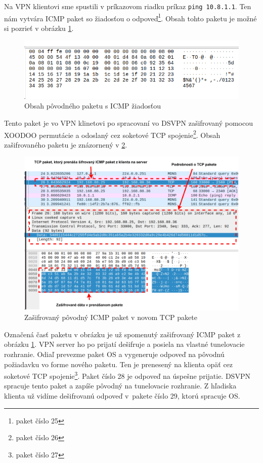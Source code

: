 Na VPN klientovi sme spustili v príkazovom riadku príkaz \lstinline|ping 10.8.1.1|. Ten nám vytvára ICMP paket so žiadosťou o odpoveď\footnote{paket číslo 25}. Obsah tohto paketu je možné si pozrieť v obrázku \ref{req}. %
\begin{figure}[h!]
	\centering
	\includegraphics[width=1\textwidth]{figures/req}
	\caption{Obsah pôvodného paketu s ICMP žiadosťou}
	\label{req}
\end{figure}
Tento paket je vo VPN klinetovi po spracovaní vo DSVPN zašifrovaný pomocou XOODOO permutácie a odoslaný cez soketové TCP spojenie\footnote{paket číslo 26}. Obsah zašifrovaného paketu je znázornený v \ref{sifrovanypaket}. 
\begin{figure}[h!]
	\centering
	\includegraphics[width=1\textwidth]{figures/sifrovanypaket}
	\caption{Zašifrovaný pôvodný ICMP paket v novom TCP pakete}
	\label{sifrovanypaket}
\end{figure}
Označená časť paketu v obrázku je už spomenutý zašifrovaný ICMP paket z obrázku \ref{req}. VPN server ho po prijatí dešifruje a posiela na vlastné tunelovacie rozhranie. Odiaľ prevezme paket OS a vygeneruje odpoveď na pôvodnú požiadavku vo forme nového paketu. Ten je prenesený na klienta opäť cez soketové TCP spojenie\footnote{paket číslo 27}. Paket číslo 28 je odpoveď na úspešne prijatie. DSVPN spracuje tento paket a zapíše pôvodný na tunelovacie rozhranie. Z hľadiska klienta už vidíme dešifrovanú odpoveď v~pakete číslo 29, ktorú spracuje OS.

